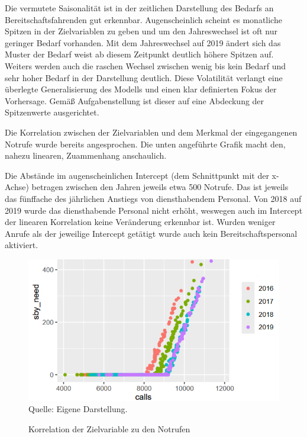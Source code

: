 \FloatBarrier

Die vermutete Saisonalität ist in der zeitlichen Darstellung des Bedarfs an Bereitschaftsfahrenden gut erkennbar. Augenscheinlich scheint es monatliche Spitzen in der Zielvariablen zu geben und um den Jahreswechsel ist oft nur  geringer Bedarf vorhanden. Mit dem Jahreswechsel auf 2019 ändert sich das Muster der Bedarf weist ab diesem Zeitpunkt deutlich höhere Spitzen auf. Weiters werden auch die raschen Wechsel zwischen wenig bis kein Bedarf und sehr hoher Bedarf in der Darstellung deutlich. Diese Volatilität verlangt eine überlegte Generalisierung des Modells und einen klar definierten Fokus der Vorhersage. Gemäß Aufgabenstellung ist dieser auf eine Abdeckung der Spitzenwerte ausgerichtet.

Die Korrelation zwischen der Zielvariablen und dem Merkmal der eingegangenen Notrufe wurde bereits angesprochen. Die unten angeführte Grafik macht den, nahezu linearen, Zuammenhang anschaulich.

Die Abstände im augenscheinlichen Intercept (dem Schnittpunkt mit der x-Achse) betragen zwischen den Jahren jeweils etwa 500 Notrufe. Das ist jeweils das fünffache des jährlichen Anstiegs von diensthabendem Personal. Von 2018 auf 2019 wurde das diensthabende Personal nicht erhöht, weswegen auch im Intercept der linearen Korrelation keine Veränderung erkennbar ist. Wurden weniger Anrufe als der jeweilige Intercept getätigt wurde auch kein Bereitschaftspersonal aktiviert. 

\begin{figure}[h]
\centering
\caption{Korrelation der Zielvariable zu den Notrufen}
\includegraphics[width=15cm]{01_resources/call_correlation_year.png}\\
Quelle: Eigene Darstellung.
\label{fig:call_correlation_year}
\end{figure}
\FloatBarrier

